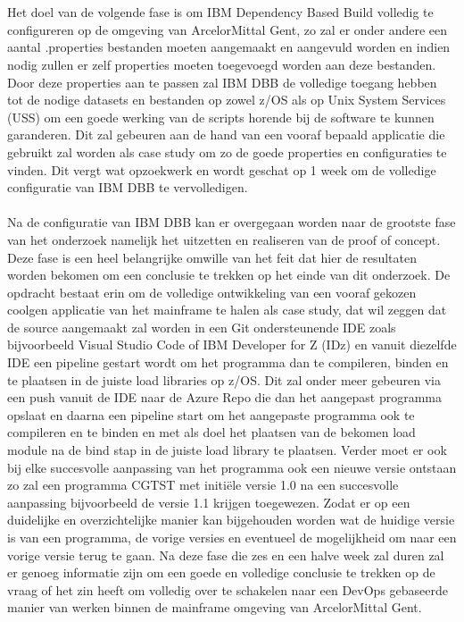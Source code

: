 \\ \\
Het doel van de volgende fase is om IBM Dependency Based Build volledig te configureren op de omgeving van ArcelorMittal Gent,
zo zal er onder andere een aantal .properties bestanden moeten aangemaakt en aangevuld worden en indien nodig zullen er zelf properties moeten toegevoegd worden aan deze bestanden.
Door deze properties aan te passen zal IBM DBB de volledige toegang hebben tot de nodige datasets en bestanden op zowel z/OS als op Unix System Services (USS) om een goede werking van de scripts horende bij de software te kunnen garanderen. Dit zal gebeuren aan de hand van een vooraf bepaald applicatie die gebruikt zal worden als case study om zo de goede properties en configuraties te vinden.
Dit vergt wat opzoekwerk en wordt geschat op 1 week om de volledige configuratie van IBM DBB te vervolledigen.
\\ \\
Na de configuratie van IBM DBB kan er overgegaan worden naar de grootste fase van het onderzoek namelijk het uitzetten en realiseren van de proof of concept.
Deze fase is een heel belangrijke omwille van het feit dat hier de resultaten worden bekomen om een conclusie te trekken op het einde van dit onderzoek.
De opdracht bestaat erin om de volledige ontwikkeling van een vooraf gekozen coolgen applicatie van het mainframe te halen als case study,
dat wil zeggen dat de source aangemaakt zal worden in een Git ondersteunende IDE zoals bijvoorbeeld Visual Studio Code of IBM Developer for Z (IDz) en vanuit diezelfde IDE een pipeline
gestart wordt om het programma dan te compileren, binden en te plaatsen in de juiste load libraries op z/OS.
Dit zal onder meer gebeuren via een push vanuit de IDE naar de Azure Repo die dan het aangepast programma opslaat en daarna een pipeline start om het aangepaste programma ook
te compileren en te binden en met als doel het plaatsen van de bekomen load module na de bind stap in de juiste load library te plaatsen.
Verder moet er ook bij elke succesvolle aanpassing van het programma ook een nieuwe versie ontstaan zo zal een programma CGTST met initiële versie 1.0 na een succesvolle
aanpassing bijvoorbeeld de versie 1.1 krijgen toegewezen.
Zodat er op een duidelijke en overzichtelijke manier kan bijgehouden worden wat de huidige versie is van een programma, de vorige versies en eventueel de mogelijkheid om naar een vorige versie terug te gaan.
Na deze fase die zes en een halve week zal duren zal er genoeg informatie zijn om een goede en volledige conclusie te trekken op de vraag of het zin heeft om volledig over te schakelen naar een DevOps gebaseerde manier van werken binnen de mainframe omgeving van ArcelorMittal Gent.
